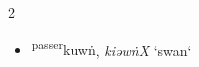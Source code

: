 \begin{multicols}{2}
\begin{itemize}






    \item {\Large{}} %
    {\large{\textsuperscript{passer}kuwṅ}}, \textit{kiəwṅX}
    `swan`






  

\end{itemize}
\end{multicols}
